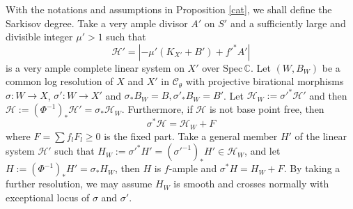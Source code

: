 \documentclass[11pt]{amsart}
\begin{document}
With the notations and assumptions in Proposition \ref{cat},   we shall define the Sarkisov degree. Take a  very ample divisor $ A'  $ on $ S' $ and a sufficiently large and divisible integer $ \mu'>1 $ such that 
\[ \mathcal{H}'=|-\mu' (K_{X'}+B') +f'^*A'| \]
is a very ample complete linear system on $ X' $ over $ \mathrm{Spec}\,\mathbb{C} $. Let $ (W,B_W) $ be a common log resolution of $ X $ and $ X' $ in $ \mathcal{C}_\theta $ with projective birational morphisms $ \sigma:W\to X$,   $\sigma':W\to X' $ and $\sigma_*B_W=B, \sigma'_*B_W=B' $. Let $\mathcal{H}_W:=\sigma'^*\mathcal{H}'$
and then  $\mathcal{H}:=(\Phi^{-1})_*\mathcal{H}'=\sigma_*\mathcal{H}_W$. Furthermore, if $ \mathcal{H} $ is not base point free, then
\[ \sigma^*\mathcal{H}=\mathcal{H}_W+F \]
where $ F=\sum f_lF_l\geqslant0 $ is the fixed part. Take a general member $ H' $ of the linear system $ \mathcal{H}' $ such that $ H_W:=\sigma'^*H'=(\sigma'^{-1})_*H'\in \mathcal{H}_W $, and let $ H:=(\Phi^{-1})_*H'=\sigma_*H_{W} $, then $H$ is $f$-ample and $ \sigma^*H=H_W+F $. By taking  a further resolution, we may assume $H_{W}$ is smooth and crosses normally with exceptional locus of $\sigma$ and $\sigma'$.
\end{document}
